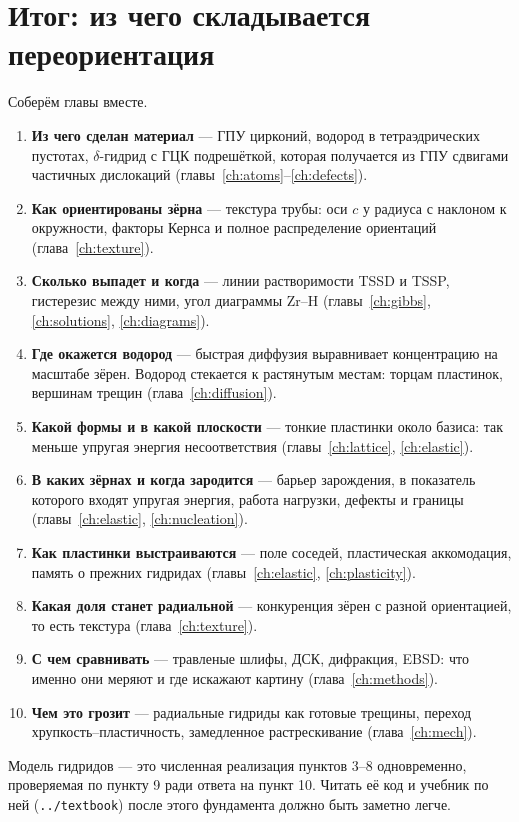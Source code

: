 \chapter*{Итог: из чего складывается переориентация}

Соберём главы вместе.
\begin{enumerate}
\item \textbf{Из чего сделан материал} --- ГПУ цирконий, водород в тетраэдрических пустотах, $\delta$-гидрид с ГЦК
  подрешёткой, которая получается из ГПУ сдвигами частичных дислокаций (главы~\ref{ch:atoms}--\ref{ch:defects}).
\item \textbf{Как ориентированы зёрна} --- текстура трубы: оси $c$ у радиуса с наклоном к окружности, факторы Кернса
  и полное распределение ориентаций (глава~\ref{ch:texture}).
\item \textbf{Сколько выпадет и когда} --- линии растворимости TSSD и TSSP, гистерезис между ними, угол диаграммы
  Zr--H (главы~\ref{ch:gibbs}, \ref{ch:solutions}, \ref{ch:diagrams}).
\item \textbf{Где окажется водород} --- быстрая диффузия выравнивает концентрацию на масштабе зёрен. Водород
  стекается к растянутым местам: торцам пластинок, вершинам трещин (глава~\ref{ch:diffusion}).
\item \textbf{Какой формы и в какой плоскости} --- тонкие пластинки около базиса: так меньше упругая энергия
  несоответствия (главы~\ref{ch:lattice}, \ref{ch:elastic}).
\item \textbf{В каких зёрнах и когда зародится} --- барьер зарождения, в показатель которого входят упругая
  энергия, работа нагрузки, дефекты и границы (главы~\ref{ch:elastic}, \ref{ch:nucleation}).
\item \textbf{Как пластинки выстраиваются} --- поле соседей, пластическая аккомодация, память о прежних гидридах
  (главы~\ref{ch:elastic}, \ref{ch:plasticity}).
\item \textbf{Какая доля станет радиальной} --- конкуренция зёрен с разной ориентацией, то есть текстура
  (глава~\ref{ch:texture}).
\item \textbf{С чем сравнивать} --- травленые шлифы, ДСК, дифракция, EBSD: что именно они меряют и где искажают
  картину (глава~\ref{ch:methods}).
\item \textbf{Чем это грозит} --- радиальные гидриды как готовые трещины, переход хрупкость--пластичность,
  замедленное растрескивание (глава~\ref{ch:mech}).
\end{enumerate}
Модель гидридов --- это численная реализация пунктов 3--8 одновременно, проверяемая по пункту 9 ради ответа на
пункт 10. Читать её код и учебник по ней (\texttt{../textbook}) после этого фундамента должно быть заметно легче.
